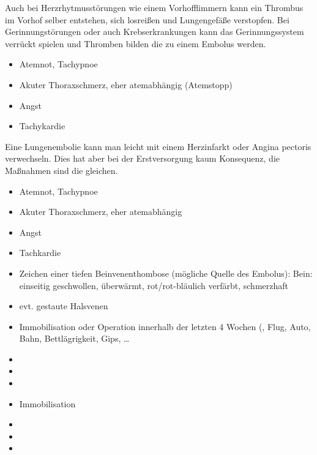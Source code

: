 Auch bei Herzrhytmusstörungen wie einem
Vorhofflimmern kann ein Thrombus im Vorhof selber entstehen, 
sich losreißen und Lungengefäße verstopfen. Bei
Gerinnungstörungen oder auch Krebserkrankungen kann das
Gerinnungssystem verrückt spielen und Thromben bilden die
zu einem Embolus werden.

{
\begin{itemize}
  \item Atemnot, Tachypnoe
  \item Akuter Thoraxschmerz, eher atemabhängig (Atemstopp)
  \item Angst
  \item Tachykardie
\end{itemize}

Eine Lungenembolie kann man leicht mit einem Herzinfarkt oder Angina
pectoris verwechseln. Dies hat aber bei der Erstversorgung kaum
Konsequenz, die Maßnahmen sind die gleichen.


}{
\begin{itemize}
  \item Atemnot, Tachypnoe
  \item Akuter Thoraxschmerz, eher atemabhängig
  \item Angst
  \item Tachkardie
\end{itemize}
}{}{}{}


{
\begin{itemize}
  \item Zeichen einer tiefen Beinvenenthombose (mögliche
  Quelle des Embolus): Bein: einseitig geschwollen,
  überwärmt, rot/rot-bläulich verfärbt, schmerzhaft
  \item evt. gestaute Halsvenen
\end{itemize}
}{

}{}{}{}


{
\begin{itemize}
  \item Immobilisation oder Operation innerhalb
  der letzten 4 Wochen (, Flug, Auto,
  Bahn, Bettlägrigkeit, Gips, {\dots}
  \item {}
  \item {}
  \item {}
\end{itemize}
}{
\begin{itemize}
  \item Immobilisation
  \item {}
  \item {}
  \item {}
\end{itemize}
}{}{}{}


